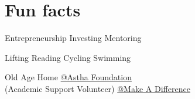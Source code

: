 \documentclass[]{divine-waters-resume}
\begin{document}
\begin{minipage}[t]{0.66\textwidth}



\section{Fun facts}
Entrepreneurship \textbullet{} Investing \textbullet{} Mentoring

Lifting \textbullet{} Reading \textbullet{} Cycling \textbullet{} Swimming

Old Age Home \textbullet{} \href{https://www.helpageindia.org/}{@Astha Foundation} \\
 (Academic Support Volunteer) \textbullet{} \href{https://makeadiff.in}{@Make A Difference}
\end{minipage}
\end{document}
